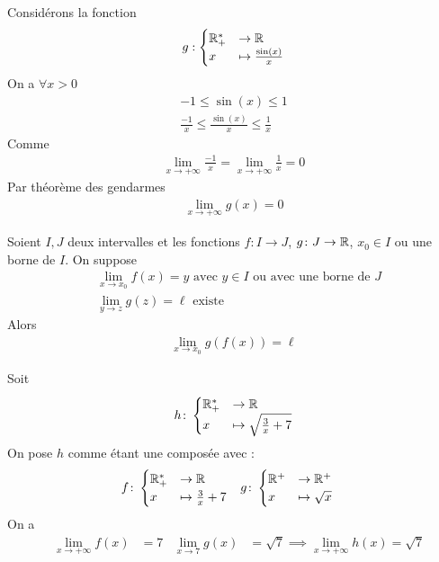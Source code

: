 \begin{exemple}
Considérons la fonction 
\begin{align*}
g : 
\begin{cases}
\mathbb{R}^*_+ &\to \mathbb{R} \\
x &\mapsto \frac{\sin(x)}{x}
\end{cases}
\end{align*}
On a $\forall x > 0$
\begin{align*}
-1 \leq \sin(x) \leq 1 \\
\frac{-1}{x} \leq \frac{\sin(x)}{x} \leq \frac{1}{x}
\end{align*}
Comme 
\begin{align*}
\lim_{x \to +\infty} \frac{-1}{x} = \lim_{x \to +\infty} \frac{1}{x} = 0
\end{align*}
Par théorème des gendarmes 
\begin{align*}
\lim_{x \to +\infty} g(x) = 0
\end{align*}
\end{exemple}

\begin{graybox}
\begin{theoreme}
Soient $I, J$ deux intervalles et les fonctions $f\colon I \to J$, $g \colon J \to \mathbb{R}$, $x_0 \in I$ ou une borne de $I$. On suppose 
\begin{align*}
&\lim_{x \to x_0} f(x) = y \text{ avec } y \in I \text{ ou avec une borne de } J \\
&\lim_{y \to z} g(z) = \ell \text{ existe }
\end{align*}
Alors 
\begin{align*}
\lim_{x \to x_0} g(f(x)) = \ell
\end{align*} 
\end{theoreme}
\end{graybox}

\begin{exemple}
Soit 
\begin{align*}
h \colon 
\begin{cases}
\mathbb{R}^*_+ &\to \mathbb{R} \\
x &\mapsto \sqrt{\frac{3}{x} + 7}
\end{cases}
\end{align*}
On pose $h$ comme étant une composée avec :
\begin{align*}
f \colon 
&\begin{cases}
\mathbb{R}^*_+ &\to \mathbb{R} \\
x &\mapsto \frac{3}{x} + 7
\end{cases}
&
g \colon 
&\begin{cases}
\mathbb{R}^+ &\to \mathbb{R}^+ \\
x &\mapsto \sqrt{x}
\end{cases}
\end{align*}
On a 
\begin{align*}
&\lim_{x \to +\infty} f(x) &= 7 & \lim_{x \to 7} g(x) &= \sqrt{7} \implies \lim_{x \to +\infty} h(x) = \sqrt{7}
\end{align*}
\end{exemple}

